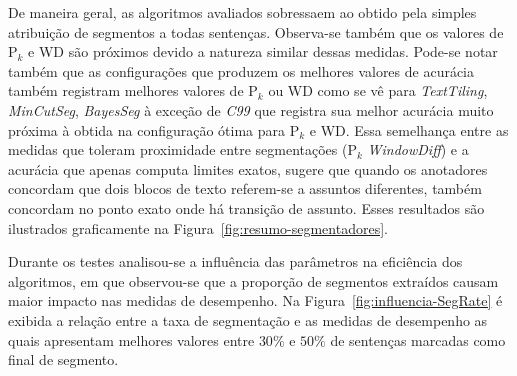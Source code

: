 


De maneira geral, as algoritmos avaliados sobressaem ao obtido pela simples atribuição de segmentos a todas sentenças. Observa-se também que os valores de P$_k$ e WD são próximos devido a natureza similar dessas medidas. Pode-se notar também que as configurações que produzem os melhores valores de acurácia também registram melhores valores de P$_k$ ou WD como se vê para \textit{TextTiling}, \textit{MinCutSeg}, \textit{BayesSeg} à exceção de \textit{C99} que registra sua melhor acurácia muito próxima à obtida na configuração ótima para P$_k$ e WD. 
Essa semelhança entre as medidas que toleram proximidade entre segmentações (P$_k$ \textit{WindowDiff}) e a acurácia que apenas computa limites exatos, sugere que quando os anotadores concordam que dois blocos de texto referem-se a assuntos diferentes, também concordam no ponto exato onde há transição de assunto.  Esses resultados são ilustrados graficamente na Figura~\ref{fig:resumo-segmentadores}.



Durante os testes analisou-se a influência das parâmetros na eficiência dos algoritmos, em que observou-se que a proporção de segmentos extraídos causam maior impacto nas medidas de desempenho. Na Figura~\ref{fig:influencia-SegRate} é exibida a relação entre a taxa de segmentação e as medidas de desempenho as quais apresentam melhores valores entre $30\%$ e $50\%$ de sentenças marcadas como final de segmento.



